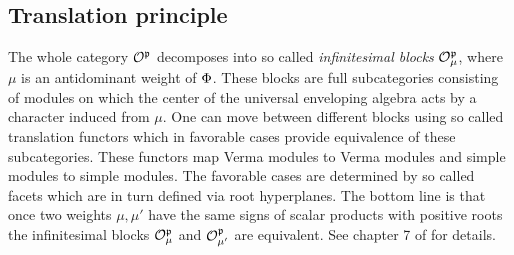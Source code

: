 \subsection{Translation principle}\label{sec:translation}
The whole category $\mathcal{O}^ {\mathfrak{p}}$ decomposes into so called \emph{infinitesimal blocks} $\mathcal{O}^{\mathfrak{p}}_\mu$, where $\mu$ is an antidominant weight of $\Phi$. These blocks are full subcategories consisting of modules on which the center of the universal enveloping algebra acts by a character induced from $\mu$.  One can move between different blocks using so called translation functors which in favorable cases provide equivalence of these subcategories. These functors map Verma modules to Verma modules and simple modules to simple modules. The favorable cases are determined by so called facets which are in turn defined via root hyperplanes. The bottom line is that once two weights $\mu, \mu'$ have the same signs of scalar products with positive roots the infinitesimal blocks $\mathcal{O}^{\mathfrak{p}}_\mu$ and $\mathcal{O}^{\mathfrak{p}}_{\mu'}$ are equivalent. See chapter 7 of \cite{humphreys_representations_2008} for details.

%
%
%
%

